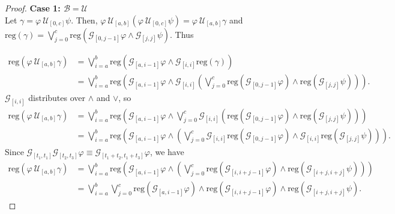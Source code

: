 \documentclass[runningheads]{llncs}
\renewcommand{\phi}{\varphi}
\begin{document}
\begin{proof}

\textbf{Case 1: $\mathbf{\mathcal{B} = \mathcal{U}}$}\\

\noindent Let $\gamma = \phi \ \mathcal{U}_{[0,c]} \psi$. Then, $\phi \ \mathcal{U}_{[a,b]}(\phi \ \mathcal{U}_{[0,c]} \psi) = \phi \ \mathcal{U}_{[a,b]}\gamma$ and $\text{reg}\left(\gamma\right) = \bigvee_{j=0}^{c} \text{reg}\left(\mathcal{G}_{[0,j-1]}\phi \land \mathcal{G}_{[j, j]}\psi\right).$ Thus

\begin{align*}
\text{reg}\left(\phi \ \mathcal{U}_{[a,b]}\gamma\right) &= \bigvee_{i=a}^{b} \text{reg}\left(\mathcal{G}_{[a,i-1]}\phi \land \mathcal{G}_{[i, i]}\text{reg}\left(\gamma\right)\right)\\
&= \bigvee_{i=a}^{b} \text{reg}\left(\mathcal{G}_{[a,i-1]}\phi \land  \mathcal{G}_{[i, i]}\left( \bigvee_{j=0}^{c} \text{reg}\left(\mathcal{G}_{[0,j-1]}\phi\right) \land \text{reg}\left(\mathcal{G}_{[j, j]}\psi\right) \right) \right).
\end{align*}
$\mathcal{G}_{[i, i]}$ distributes over $\land$ and $\lor$, so
\begin{align*}
\text{reg}\left(\phi \ \mathcal{U}_{[a,b]}\gamma\right) &= \bigvee_{i=a}^{b} \text{reg}\left(\mathcal{G}_{[a,i-1]}\phi \land  \bigvee_{j=0}^{c} \mathcal{G}_{[i, i]}\left( \text{reg}\left(\mathcal{G}_{[0,j-1]}\phi\right) \land \text{reg}\left(\mathcal{G}_{[j, j]}\psi\right) \right) \right) \\
&= \bigvee_{i=a}^{b} \text{reg}\left(\mathcal{G}_{[a,i-1]}\phi \land \left( \bigvee_{j=0}^{c} \mathcal{G}_{[i, i]}\text{reg}\left(\mathcal{G}_{[0,j-1]}\phi\right) \land \mathcal{G}_{[i, i]}\text{reg}\left(
\mathcal{G}_{[j, j]}\psi \right) \right) \right).
\end{align*}
Since $\mathcal{G}_{[t_1,t_1]} \mathcal{G}_{[t_2,t_3]} \phi \equiv \mathcal{G}_{[t_1+t_2,t_1+t_3]} \phi$, we have
\begin{align*}
\text{reg}\left(\phi \ \mathcal{U}_{[a,b]}\gamma\right) &= \bigvee_{i=a}^{b} \text{reg}\left(\mathcal{G}_{[a,i-1]}\phi \land \left( \bigvee_{j=0}^{c} \text{reg}\left(\mathcal{G}_{[i,i+j-1]}\phi\right) \land \text{reg}\left(\mathcal{G}_{[i+j, i+j]}\psi \right) \right) \right) \\
&= \bigvee_{i=a}^{b}  \bigvee_{j=0}^{c} \text{reg}\left(\mathcal{G}_{[a,i-1]}\phi\right) \land  \text{reg}\left(\mathcal{G}_{[i,i+j-1]}\phi\right) \land \text{reg}\left(\mathcal{G}_{[i+j, i+j]}\psi \right).
\end{align*}

\end{proof}
\end{document}
